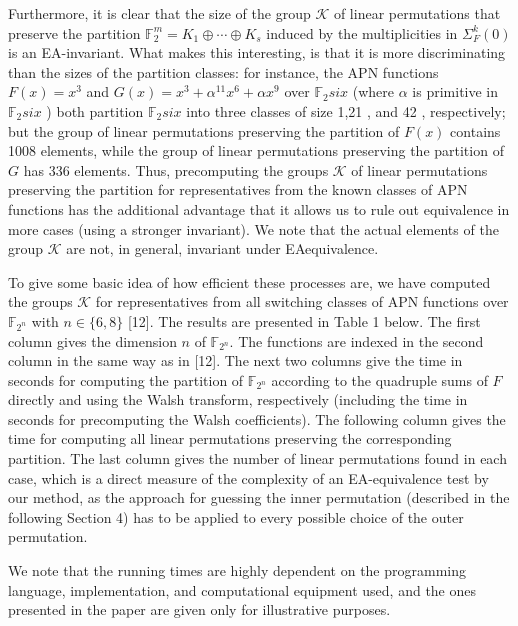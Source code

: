 \documentclass[10pt]{article}
\begin{document}
Furthermore, it is clear that the size of the group $\mathcal{K}$ of linear permutations that preserve the partition $\mathbb{F}_{2}^{m}=K_{1} \oplus \cdots \oplus K_{s}$ induced by the multiplicities in $\Sigma_{F}^{k}(0)$ is an EA-invariant. What makes this interesting, is that it is more discriminating than the sizes of the partition classes: for instance, the APN functions $F(x)=x^{3}$ and $G(x)=x^{3}+\alpha^{11} x^{6}+\alpha x^{9}$ over $\mathbb{F}_{2} s i x$ (where $\alpha$ is primitive in $\mathbb{F}_{2} s i x$ ) both partition $\mathbb{F}_{2} s i x$ into three classes of size 1,21 , and 42 , respectively; but the group of linear permutations preserving the partition of $F(x)$ contains 1008 elements, while the group of linear permutations preserving the partition of $G$ has 336 elements. Thus, precomputing the groups $\mathcal{K}$ of linear permutations preserving the partition for representatives from the known classes of APN functions has the additional advantage that it allows us to rule out equivalence in more cases (using a stronger invariant). We note that the actual elements of the group $\mathcal{K}$ are not, in general, invariant under EAequivalence.

To give some basic idea of how efficient these processes are, we have computed the groups $\mathcal{K}$ for representatives from all switching classes of APN functions over $\mathbb{F}_{2^{n}}$ with $n \in\{6,8\}$ [12]. The results are presented in Table 1 below. The first column gives the dimension $n$ of $\mathbb{F}_{2^{n}}$. The functions are indexed in the second column in the same way as in [12]. The next two columns give the time in seconds for computing the partition of $\mathbb{F}_{2^{n}}$ according to the quadruple sums of $F$ directly and using the Walsh transform, respectively (including the time in seconds for precomputing the Walsh coefficients). The following column gives the time for computing all linear permutations preserving the corresponding partition. The last column gives the number of linear permutations found in each case, which is a direct measure of the complexity of an EA-equivalence test by our method, as the approach for guessing the inner permutation (described in the following Section 4) has to be applied to every possible choice of the outer permutation.

We note that the running times are highly dependent on the programming language, implementation, and computational equipment used, and the ones presented in the paper are given only for illustrative purposes.
\end{document}
